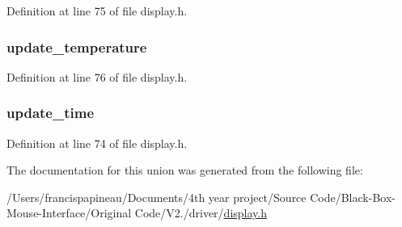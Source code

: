 \-Definition at line 75 of file display.\-h.

\hypertarget{unions__display__flags_a49b58805245fc6fb2a9dd89ab9a41ef4}{
\subsubsection[{update\-\_\-temperature}]{ {\bf update\-\_\-temperature}}}\label{unions__display__flags_a49b58805245fc6fb2a9dd89ab9a41ef4}


\-Definition at line 76 of file display.\-h.

\hypertarget{unions__display__flags_a0fe35dbb92aa1da6230872d35273a99b}{
\subsubsection[{update\-\_\-time}]{ {\bf update\-\_\-time}}}\label{unions__display__flags_a0fe35dbb92aa1da6230872d35273a99b}


\-Definition at line 74 of file display.\-h.



\-The documentation for this union was generated from the following file\-:\begin{DoxyCompactItemize}
\item 
/\-Users/francispapineau/\-Documents/4th year project/\-Source Code/\-Black-\/\-Box-\/\-Mouse-\/\-Interface/\-Original Code/\-V2./driver/\hyperlink{display_8h}{display.\-h}\end{DoxyCompactItemize}
